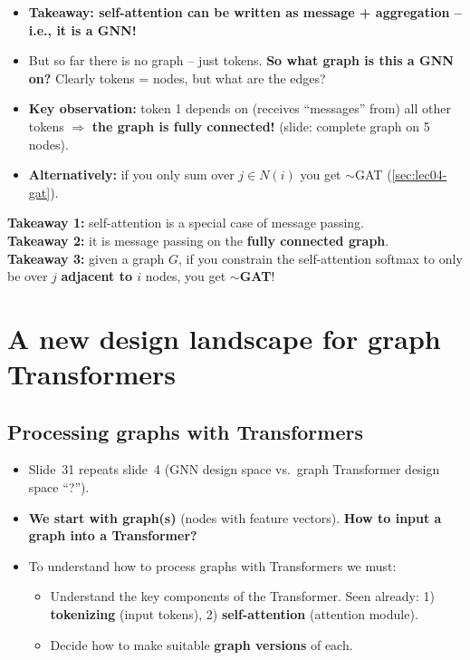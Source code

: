\begin{itemize}
  \item \textbf{Takeaway: self-attention can be written as message +
    aggregation -- i.e., it is a GNN!}
  \item But so far there is no graph -- just tokens. \textbf{So what graph is
    this a GNN on?} Clearly tokens = nodes, but what are the edges?
  \item \textbf{Key observation:} token 1 depends on (receives ``messages''
    from) all other tokens $\Rightarrow$ \textbf{the graph is fully connected!}
    (slide: complete graph on 5 nodes).
  \item \textbf{Alternatively:} if you only sum over $j\in N(i)$ you get
    $\sim$GAT (\cref{sec:lec04-gat}).
\end{itemize}
\begin{keyidea}
  \textbf{Takeaway 1:} self-attention is a special case of message passing.\\
  \textbf{Takeaway 2:} it is message passing on the \textbf{fully connected
  graph}.\\
  \textbf{Takeaway 3:} given a graph $G$, if you constrain the self-attention
  softmax to only be over $j$ \textbf{adjacent to $i$} nodes, you get
  $\sim$\textbf{GAT}!
\end{keyidea}

\section{A new design landscape for graph Transformers}\label{sec:lec08-design}

\subsection{Processing graphs with Transformers}\label{sec:lec08-process}

\begin{itemize}
  \item Slide~31 repeats slide~4 (GNN design space vs.\ graph Transformer design
    space ``?'').
  \item \textbf{We start with graph(s)} (nodes with feature vectors). \textbf{How
    to input a graph into a Transformer?}
  \item To understand how to process graphs with Transformers we must:
    \begin{itemize}
      \item Understand the key components of the Transformer. Seen already:
        1) \textbf{tokenizing} (input tokens), 2) \textbf{self-attention}
        (attention module).
      \item Decide how to make suitable \textbf{graph versions} of each.
    \end{itemize}
\end{itemize}

